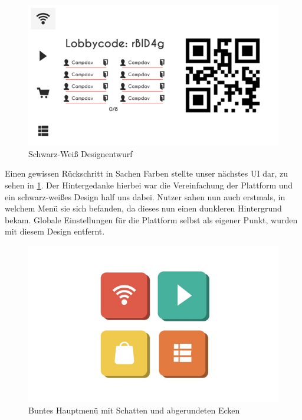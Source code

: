 \newline
\begin{center}
    \begin{figure}
        \includegraphics[scale=0.7]{images/design04.png} 
        \caption{Schwarz-Weiß Designentwurf}
        \label{img:design04}
    \end{figure}
\end{center}
Einen gewissen Rückschritt in Sachen Farben stellte unser nächstes UI dar, zu sehen in \ref{img:design04}. Der Hintergedanke hierbei war die Vereinfachung der Plattform und ein schwarz-weißes Design half uns dabei. Nutzer sahen nun auch erstmals, in welchem Menü sie sich befanden, da dieses nun einen dunkleren Hintergrund bekam. Globale Einstellungen für die Plattform selbst als eigener Punkt, wurden mit diesem Design entfernt.
\newline
\begin{center}
    \begin{figure}
        \includegraphics[scale=0.7]{images/design05.png}
        \caption{Buntes Hauptmenü mit Schatten und abgerundeten Ecken}
        \label{img:design05}
    \end{figure}
\end{center}
